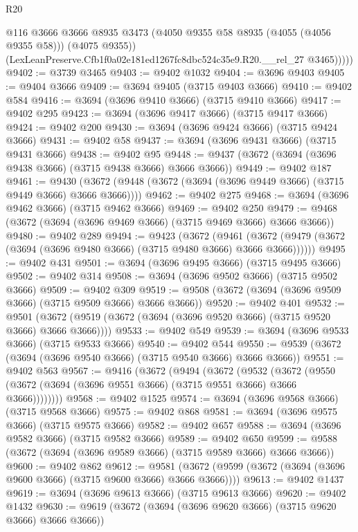 \begin{lexlean}{R20}
\begin{coremodule}
              @116
              @3666
              @3666
              @8935
              @3473
              (@4050 @9355 @58 @8935 (@4055 (@4056 @9355 @58)))
              (@4075 @9355))
            (LexLeanPreserve.Cfb1f0a02e181ed1267fc8dbc524c35e9.R20.__rel_27 @3465)))))
@9402 := @3739 @3465
@9403 := @9402 @1032
@9404 := @3696 @9403
@9405 := @9404 @3666
@9409 := @3694 @9405 (@3715 @9403 @3666)
@9410 := @9402 @584
@9416 := @3694 (@3696 @9410 @3666) (@3715 @9410 @3666)
@9417 := @9402 @295
@9423 := @3694 (@3696 @9417 @3666) (@3715 @9417 @3666)
@9424 := @9402 @200
@9430 := @3694 (@3696 @9424 @3666) (@3715 @9424 @3666)
@9431 := @9402 @58
@9437 := @3694 (@3696 @9431 @3666) (@3715 @9431 @3666)
@9438 := @9402 @95
@9448 := @9437 (@3672 (@3694 (@3696 @9438 @3666) (@3715 @9438 @3666) @3666 @3666))
@9449 := @9402 @187
@9461 := @9430 (@3672 (@9448 (@3672 (@3694 (@3696 @9449 @3666) (@3715 @9449 @3666) @3666 @3666))))
@9462 := @9402 @275
@9468 := @3694 (@3696 @9462 @3666) (@3715 @9462 @3666)
@9469 := @9402 @250
@9479 := @9468 (@3672 (@3694 (@3696 @9469 @3666) (@3715 @9469 @3666) @3666 @3666))
@9480 := @9402 @289
@9494 := @9423
    (@3672
      (@9461 (@3672 (@9479 (@3672 (@3694 (@3696 @9480 @3666) (@3715 @9480 @3666) @3666 @3666))))))
@9495 := @9402 @431
@9501 := @3694 (@3696 @9495 @3666) (@3715 @9495 @3666)
@9502 := @9402 @314
@9508 := @3694 (@3696 @9502 @3666) (@3715 @9502 @3666)
@9509 := @9402 @309
@9519 := @9508 (@3672 (@3694 (@3696 @9509 @3666) (@3715 @9509 @3666) @3666 @3666))
@9520 := @9402 @401
@9532 := @9501 (@3672 (@9519 (@3672 (@3694 (@3696 @9520 @3666) (@3715 @9520 @3666) @3666 @3666))))
@9533 := @9402 @549
@9539 := @3694 (@3696 @9533 @3666) (@3715 @9533 @3666)
@9540 := @9402 @544
@9550 := @9539 (@3672 (@3694 (@3696 @9540 @3666) (@3715 @9540 @3666) @3666 @3666))
@9551 := @9402 @563
@9567 := @9416
    (@3672
      (@9494
        (@3672
          (@9532
            (@3672 (@9550 (@3672 (@3694 (@3696 @9551 @3666) (@3715 @9551 @3666) @3666 @3666))))))))
@9568 := @9402 @1525
@9574 := @3694 (@3696 @9568 @3666) (@3715 @9568 @3666)
@9575 := @9402 @868
@9581 := @3694 (@3696 @9575 @3666) (@3715 @9575 @3666)
@9582 := @9402 @657
@9588 := @3694 (@3696 @9582 @3666) (@3715 @9582 @3666)
@9589 := @9402 @650
@9599 := @9588 (@3672 (@3694 (@3696 @9589 @3666) (@3715 @9589 @3666) @3666 @3666))
@9600 := @9402 @862
@9612 := @9581 (@3672 (@9599 (@3672 (@3694 (@3696 @9600 @3666) (@3715 @9600 @3666) @3666 @3666))))
@9613 := @9402 @1437
@9619 := @3694 (@3696 @9613 @3666) (@3715 @9613 @3666)
@9620 := @9402 @1432
@9630 := @9619 (@3672 (@3694 (@3696 @9620 @3666) (@3715 @9620 @3666) @3666 @3666))

\end{coremodule}
\end{lexlean}
